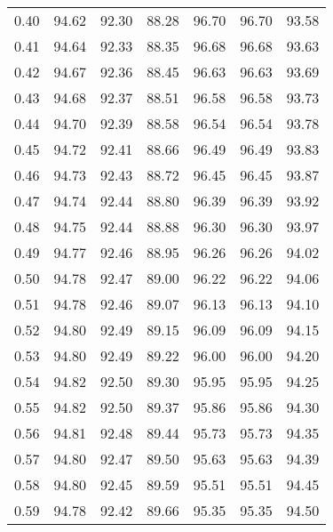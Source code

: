 \begin{tabular}{|c|c|c|c|c|c|c|}
      0.40 &     94.62 &     92.30 &      88.28 &   96.70 &      96.70 &         93.58 \\
      0.41 &     94.64 &     92.33 &      88.35 &   96.68 &      96.68 &         93.63 \\
      0.42 &     94.67 &     92.36 &      88.45 &   96.63 &      96.63 &         93.69 \\
      0.43 &     94.68 &     92.37 &      88.51 &   96.58 &      96.58 &         93.73 \\
      0.44 &     94.70 &     92.39 &      88.58 &   96.54 &      96.54 &         93.78 \\
      0.45 &     94.72 &     92.41 &      88.66 &   96.49 &      96.49 &         93.83 \\
      0.46 &     94.73 &     92.43 &      88.72 &   96.45 &      96.45 &         93.87 \\
      0.47 &     94.74 &     92.44 &      88.80 &   96.39 &      96.39 &         93.92 \\
      0.48 &     94.75 &     92.44 &      88.88 &   96.30 &      96.30 &         93.97 \\
      0.49 &     94.77 &     92.46 &      88.95 &   96.26 &      96.26 &         94.02 \\
      0.50 &     94.78 &     92.47 &      89.00 &   96.22 &      96.22 &         94.06 \\
      0.51 &     94.78 &     92.46 &      89.07 &   96.13 &      96.13 &         94.10 \\
      0.52 &     94.80 &     92.49 &      89.15 &   96.09 &      96.09 &         94.15 \\
      0.53 &     94.80 &     92.49 &      89.22 &   96.00 &      96.00 &         94.20 \\
      0.54 &     94.82 &     92.50 &      89.30 &   95.95 &      95.95 &         94.25 \\
      0.55 &     94.82 &     92.50 &      89.37 &   95.86 &      95.86 &         94.30 \\
      0.56 &     94.81 &     92.48 &      89.44 &   95.73 &      95.73 &         94.35 \\
      0.57 &     94.80 &     92.47 &      89.50 &   95.63 &      95.63 &         94.39 \\
      0.58 &     94.80 &     92.45 &      89.59 &   95.51 &      95.51 &         94.45 \\
      0.59 &     94.78 &     92.42 &      89.66 &   95.35 &      95.35 &         94.50 \\

\end{tabular}
